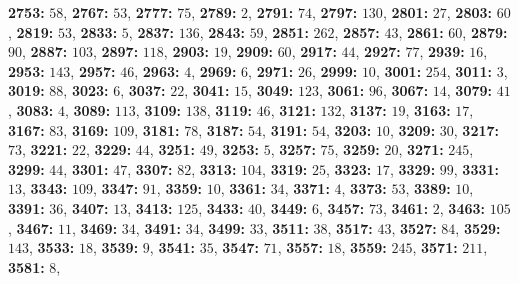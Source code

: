 \textsf{\bfseries 2753:} $58$, \textsf{\bfseries 2767:} $53$, \textsf{\bfseries 2777:} $75$, \textsf{\bfseries 2789:} $2$, \textsf{\bfseries 2791:} $74$, \textsf{\bfseries 2797:} $130$, \textsf{\bfseries 2801:} $27$, \textsf{\bfseries 2803:} $60$, \textsf{\bfseries 2819:} $53$, \textsf{\bfseries 2833:} $5$, \textsf{\bfseries 2837:} $136$, \textsf{\bfseries 2843:} $59$, \textsf{\bfseries 2851:} $262$, \textsf{\bfseries 2857:} $43$, \textsf{\bfseries 2861:} $60$, \textsf{\bfseries 2879:} $90$, \textsf{\bfseries 2887:} $103$, \textsf{\bfseries 2897:} $118$, \textsf{\bfseries 2903:} $19$, \textsf{\bfseries 2909:} $60$, \textsf{\bfseries 2917:} $44$, \textsf{\bfseries 2927:} $77$, \textsf{\bfseries 2939:} $16$, \textsf{\bfseries 2953:} $143$, \textsf{\bfseries 2957:} $46$, \textsf{\bfseries 2963:} $4$, \textsf{\bfseries 2969:} $6$, \textsf{\bfseries 2971:} $26$, \textsf{\bfseries 2999:} $10$, \textsf{\bfseries 3001:} $254$, \textsf{\bfseries 3011:} $3$, \textsf{\bfseries 3019:} $88$, \textsf{\bfseries 3023:} $6$, \textsf{\bfseries 3037:} $22$, \textsf{\bfseries 3041:} $15$, \textsf{\bfseries 3049:} $123$, \textsf{\bfseries 3061:} $96$, \textsf{\bfseries 3067:} $14$, \textsf{\bfseries 3079:} $41$, \textsf{\bfseries 3083:} $4$, \textsf{\bfseries 3089:} $113$, \textsf{\bfseries 3109:} $138$, \textsf{\bfseries 3119:} $46$, \textsf{\bfseries 3121:} $132$, \textsf{\bfseries 3137:} $19$, \textsf{\bfseries 3163:} $17$, \textsf{\bfseries 3167:} $83$, \textsf{\bfseries 3169:} $109$, \textsf{\bfseries 3181:} $78$, \textsf{\bfseries 3187:} $54$, \textsf{\bfseries 3191:} $54$, \textsf{\bfseries 3203:} $10$, \textsf{\bfseries 3209:} $30$, \textsf{\bfseries 3217:} $73$, \textsf{\bfseries 3221:} $22$, \textsf{\bfseries 3229:} $44$, \textsf{\bfseries 3251:} $49$, \textsf{\bfseries 3253:} $5$, \textsf{\bfseries 3257:} $75$, \textsf{\bfseries 3259:} $20$, \textsf{\bfseries 3271:} $245$, \textsf{\bfseries 3299:} $44$, \textsf{\bfseries 3301:} $47$, \textsf{\bfseries 3307:} $82$, \textsf{\bfseries 3313:} $104$, \textsf{\bfseries 3319:} $25$, \textsf{\bfseries 3323:} $17$, \textsf{\bfseries 3329:} $99$, \textsf{\bfseries 3331:} $13$, \textsf{\bfseries 3343:} $109$, \textsf{\bfseries 3347:} $91$, \textsf{\bfseries 3359:} $10$, \textsf{\bfseries 3361:} $34$, \textsf{\bfseries 3371:} $4$, \textsf{\bfseries 3373:} $53$, \textsf{\bfseries 3389:} $10$, \textsf{\bfseries 3391:} $36$, \textsf{\bfseries 3407:} $13$, \textsf{\bfseries 3413:} $125$, \textsf{\bfseries 3433:} $40$, \textsf{\bfseries 3449:} $6$, \textsf{\bfseries 3457:} $73$, \textsf{\bfseries 3461:} $2$, \textsf{\bfseries 3463:} $105$, \textsf{\bfseries 3467:} $11$, \textsf{\bfseries 3469:} $34$, \textsf{\bfseries 3491:} $34$, \textsf{\bfseries 3499:} $33$, \textsf{\bfseries 3511:} $38$, \textsf{\bfseries 3517:} $43$, \textsf{\bfseries 3527:} $84$, \textsf{\bfseries 3529:} $143$, \textsf{\bfseries 3533:} $18$, \textsf{\bfseries 3539:} $9$, \textsf{\bfseries 3541:} $35$, \textsf{\bfseries 3547:} $71$, \textsf{\bfseries 3557:} $18$, \textsf{\bfseries 3559:} $245$, \textsf{\bfseries 3571:} $211$, \textsf{\bfseries 3581:} $8$, 
